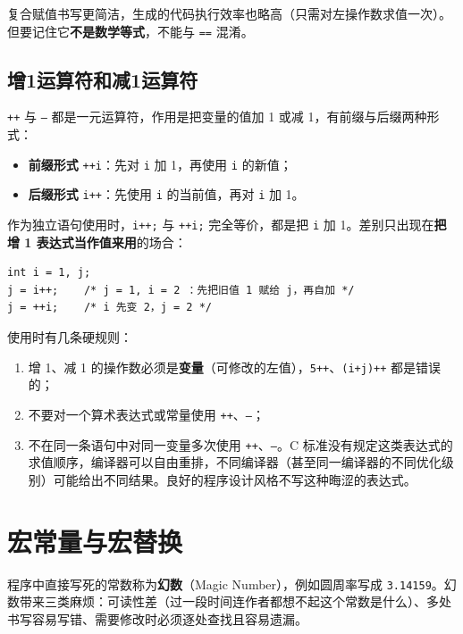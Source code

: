 复合赋值书写更简洁，生成的代码执行效率也略高（只需对左操作数求值一次）。但要记住它\textbf{不是数学等式}，不能与 \texttt{==} 混淆。

\subsection{增1运算符和减1运算符}

\texttt{++} 与 \texttt{--} 都是一元运算符，作用是把变量的值加 1 或减 1，有前缀与后缀两种形式：

\begin{itemize}
  \item \textbf{前缀形式} \texttt{++i}：先对 \texttt{i} 加 1，再使用 \texttt{i} 的新值；
  \item \textbf{后缀形式} \texttt{i++}：先使用 \texttt{i} 的当前值，再对 \texttt{i} 加 1。
\end{itemize}

作为独立语句使用时，\texttt{i++;} 与 \texttt{++i;} 完全等价，都是把 \texttt{i} 加 1。差别只出现在\textbf{把增 1 表达式当作值来用}的场合：

\begin{lstlisting}
int i = 1, j;
j = i++;    /* j = 1, i = 2 ：先把旧值 1 赋给 j，再自加 */
j = ++i;    /* i 先变 2，j = 2 */
\end{lstlisting}

使用时有几条硬规则：

\begin{enumerate}
  \item 增 1、减 1 的操作数必须是\textbf{变量}（可修改的左值），\texttt{5++}、\texttt{(i+j)++} 都是错误的；
  \item 不要对一个算术表达式或常量使用 \texttt{++}、\texttt{--}；
  \item 不在同一条语句中对同一变量多次使用 \texttt{++}、\texttt{--}。C 标准没有规定这类表达式的求值顺序，编译器可以自由重排，不同编译器（甚至同一编译器的不同优化级别）可能给出不同结果。良好的程序设计风格不写这种晦涩的表达式。
\end{enumerate}


\section{宏常量与宏替换}

程序中直接写死的常数称为\textbf{幻数}（Magic Number），例如圆周率写成 \texttt{3.14159}。幻数带来三类麻烦：可读性差（过一段时间连作者都想不起这个常数是什么）、多处书写容易写错、需要修改时必须逐处查找且容易遗漏。

